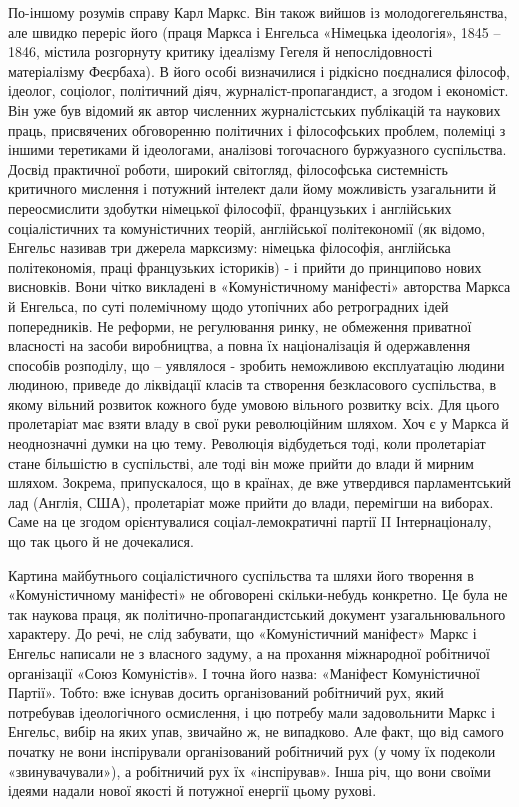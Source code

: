 \documentclass{kapital}
\begin{document}
	По-іншому розумів справу Карл Маркс. Він також вийшов із молодогегельянства, але швидко переріс його (праця Маркса і Енгельса «Німецька ідеологія», 1845 – 1846, містила розгорнуту критику ідеалізму Гегеля й непослідовності матеріалізму Феєрбаха). В його особі визначилися і рідкісно поєдналися філософ, ідеолог, соціолог, політичний діяч, журналіст-пропагандист, а згодом і економіст. Він уже був відомий як автор численних журналістських публікацій та наукових праць, присвячених обговоренню політичних і філософських проблем, полеміці з іншими теретиками й ідеологами, аналізові тогочасного буржуазного суспільства. Досвід практичної роботи, широкий світогляд, філософська системність критичного мислення і потужний інтелект  дали йому можливість узагальнити  й переосмислити здобутки німецької філософії, французьких і англійських соціалістичних та комуністичних  теорій, англійської політекономії (як відомо, Енгельс називав три джерела марксизму: німецька філософія, англійська політекономія, праці французьких істориків)   -  і прийти до принципово нових висновків.   Вони чітко викладені в «Комуністичному маніфесті» авторства Маркса й Енгельса, по суті  полемічному щодо утопічних або ретроградних ідей попередників. Не реформи, не регулювання ринку, не обмеження приватної власності на засоби виробництва, а повна їх націоналізація й одержавлення способів розподілу, що – уявлялося - зробить неможливою експлуатацію людини людиною, приведе до ліквідації класів та створення безкласового  суспільства, в якому вільний розвиток кожного буде умовою вільного розвитку всіх. Для цього пролетаріат має взяти владу в свої руки революційним шляхом. Хоч є  у Маркса  й неоднозначні думки на цю тему. Революція відбудеться тоді, коли пролетаріат стане більшістю в суспільстві, але тоді він може прийти до влади й мирним шляхом. Зокрема, припускалося, що в країнах, де вже утвердився парламентський лад (Англія, США), пролетаріат  може прийти до влади, перемігши на виборах.  Саме на це згодом орієнтувалися соціал-лемократичні партії II Інтернаціоналу, що так цього й не дочекалися. 
 
	Картина майбутнього соціалістичного суспільства та шляхи його творення в «Комуністичному маніфесті» не обговорені скільки-небудь конкретно. Це була не так наукова праця, як політично-пропагандистський документ узагальнювального характеру. До речі, не слід забувати, що «Комуністичний маніфест» Маркс і Енгельс написали не з власного задуму, а на прохання міжнародної робітничої організації «Союз Комуністів». І точна його назва: «Маніфест Комуністичної Партії». Тобто: вже існував досить організований робітничий рух, який потребував ідеологічного осмислення, і цю потребу мали задовольнити Маркс і Енгельс, вибір на яких упав, звичайно ж, не випадково. Але факт, що від самого початку не вони інспірували організований робітничий рух (у чому їх подеколи «звинувачували»), а робітничий рух їх «інспірував». Інша річ, що вони своїми ідеями надали нової якості й потужної енергії цьому рухові. 
 
\end{document}
